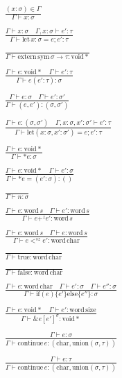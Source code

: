 \documentclass {article}
\begin{document}
\begin{gather*}
\frac
{(x : \sigma) \in \Gamma}
{\Gamma \vdash x : \sigma} \\
\\
\frac
{\Gamma \vdash x : \sigma \quad \Gamma, x : \sigma \vdash e' : \tau }
{\Gamma \vdash \text{let} \, x : \sigma = e; e' : \tau} \\
\\
\frac
{}
{\Gamma \vdash \text{extern} \, \text{sym} \, \sigma \to \tau : \text{void} *} \\
\\
\frac
{\Gamma \vdash e : \text{void} * \quad \Gamma \vdash e' : \tau}
{\Gamma \vdash e(e' : \tau) : \sigma} \\
\\
\frac
{\Gamma \vdash e : \sigma \quad \Gamma \vdash e' : \sigma'}
{\Gamma \vdash (e, e') : (\sigma, \sigma') } \\
\\
\frac
{\Gamma \vdash e : (\sigma, \sigma') \quad \Gamma, x : \sigma, x' : \sigma' \vdash e' : \tau}
{\Gamma \vdash \text{let} (x: \sigma, x' : \sigma') = e; e' : \tau} \\
\\
\frac
{\Gamma \vdash e : \text{void} *}
{\Gamma \vdash * e : \sigma} \\
\\
\frac {\Gamma \vdash e : \text{void} * \quad \Gamma \vdash e' : \sigma}
{\Gamma \vdash *e = (e' : \sigma) : ()} \\
\\
\frac
{}
{\Gamma \vdash n : \sigma} \\
\\
\frac
{\Gamma \vdash e : \text{word} \, s \quad \Gamma \vdash e' : \text{word} \, s }
{\Gamma \vdash e +^z e' : \text{word} \, s} \\
\\
\frac
{\Gamma \vdash e : \text{word} \, s \quad \Gamma \vdash e : \text{word} \, s}
{\Gamma \vdash e <^{sz} e' : \text{word} \, \text{char}} \\
\\
\frac
{}
{\Gamma \vdash \text{true} : \text{word} \, \text{char}} \\
\\
\frac
{}
{\Gamma \vdash \text{false} : \text{word} \, \text{char}} \\
\\
\frac
{\Gamma \vdash  e : \text{word} \, \text{char} \quad \Gamma \vdash e' : \sigma \quad \Gamma \vdash e'' : \sigma }
{\Gamma \vdash \text{if} (e) \{ e'\} \text{else} \{e''\} : \sigma} \\
\\
\frac
{\Gamma \vdash e : \text{void}* \quad \Gamma \vdash e' : \text{word} \, \text{size}}
{\Gamma \vdash \& e [e']^\sigma : \text{void}*} \\
\\
\frac
{\Gamma \vdash e : \sigma}
{\Gamma \vdash \text{continue} \, e : (\text{char}, \text{union} (\sigma, \tau))} \\
\\
\frac
{\Gamma \vdash e : \tau}
{\Gamma \vdash \text{continue} \, e : (\text{char}, \text{union} (\sigma, \tau))}
\end{gather*}
\end{document}
